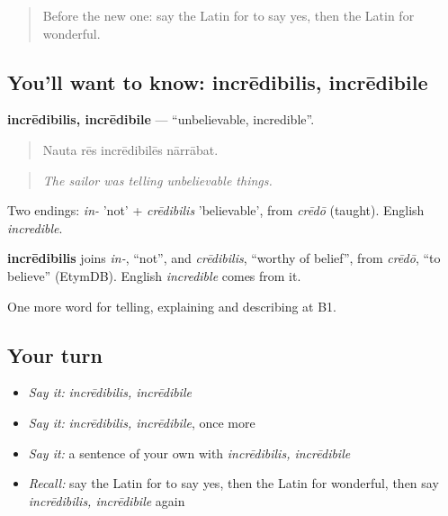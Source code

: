 \label{lesson:LA-C349-incredibilis}



\begin{quote}
Before the new one: say the Latin for to say yes, then the Latin for wonderful.
\end{quote}

\subsection*{You'll want to know: incrēdibilis, incrēdibile}
\textbf{incrēdibilis, incrēdibile} — \textquotedblleft{}unbelievable, incredible\textquotedblright{}.

\begin{quote}
Nauta rēs incrēdibilēs nārrābat.
\end{quote}

\begin{quote}
\emph{The sailor was telling unbelievable things.}
\end{quote}

Two endings: \emph{in-} 'not' + \emph{crēdibilis} 'believable', from \emph{crēdō} (taught). English \emph{incredible}.

\begin{cousinweb}
\textbf{incrēdibilis} joins \emph{in-}, \textquotedblleft{}not\textquotedblright{}, and \emph{crēdibilis}, \textquotedblleft{}worthy of belief\textquotedblright{}, from \emph{crēdō}, \textquotedblleft{}to believe\textquotedblright{} (EtymDB). English \emph{incredible} comes from it.
\end{cousinweb}

\begin{grammarlens}[title={What you've built}]
One more word for telling, explaining and describing at B1.
\end{grammarlens}

\subsection*{Your turn}
\begin{itemize}
\raggedright
  \item \emph{Say it:} \emph{incrēdibilis, incrēdibile}
  \item \emph{Say it:} \emph{incrēdibilis, incrēdibile}, once more
  \item \emph{Say it:} a sentence of your own with \emph{incrēdibilis, incrēdibile}
  \item \emph{Recall:} say the Latin for to say yes, then the Latin for wonderful, then say \emph{incrēdibilis, incrēdibile} again
\end{itemize}

